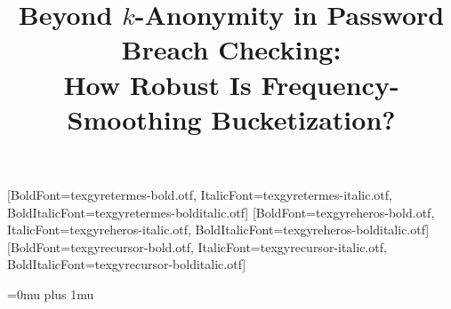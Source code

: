 \usepackage{amsmath,amssymb,amsfonts}
\usepackage{fontspec}  %
\setmainfont{texgyretermes-regular.otf}[BoldFont=texgyretermes-bold.otf, ItalicFont=texgyretermes-italic.otf, BoldItalicFont=texgyretermes-bolditalic.otf]
\setsansfont{texgyreheros-regular.otf}[BoldFont=texgyreheros-bold.otf, ItalicFont=texgyreheros-italic.otf, BoldItalicFont=texgyreheros-bolditalic.otf]
\setmonofont{texgyrecursor-regular.otf}[BoldFont=texgyrecursor-bold.otf, ItalicFont=texgyrecursor-italic.otf, BoldItalicFont=texgyrecursor-bolditalic.otf]
\usepackage{graphicx}
\usepackage{booktabs}
\usepackage{array}
\usepackage{xcolor}
\usepackage{algorithm}
\usepackage{algpseudocode}
\usepackage{tikz}
\usetikzlibrary{arrows.meta,positioning}
\usepackage{cite}
\usepackage[hyphens]{url}
\Urlmuskip=0mu plus 1mu

\newcommand{\qbar}{\ensuremath{\bar q}}
\newcommand{\phat}{\ensuremath{\hat p}}
\newcommand{\shat}{\ensuremath{\hat\sigma}}
\newcommand{\Stilde}{\ensuremath{\tilde S}}
\newcommand{\Atrain}{\ensuremath{A_{\mathrm{train}}}}
\newcommand{\Atest}{\ensuremath{A_{\mathrm{test}}}}



\title{Beyond $k$-Anonymity in Password Breach Checking:\\ How Robust Is Frequency-Smoothing Bucketization?}
\ifblind
\author{}
\else
\author{\and{}}
\fi
\maketitle

